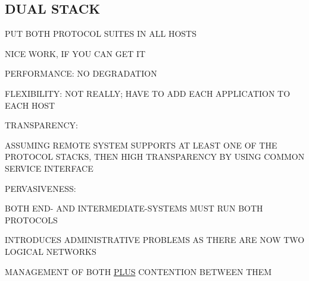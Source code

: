\begin{bwslide}
\part*	{DUAL STACK}\bf

\begin{nrtc}
\item	PUT BOTH PROTOCOL SUITES IN ALL HOSTS

\item	NICE WORK, IF YOU CAN GET IT
\end{nrtc}
\end{bwslide}




\begin{bwslide}

\begin{nrtc}
\item	PERFORMANCE: NO DEGRADATION

\item	FLEXIBILITY: NOT REALLY; HAVE TO ADD EACH APPLICATION TO EACH HOST

\item	TRANSPARENCY:
    \begin{nrtc}
    \item	ASSUMING REMOTE SYSTEM SUPPORTS AT LEAST ONE OF THE PROTOCOL
		STACKS, THEN HIGH TRANSPARENCY BY USING COMMON SERVICE
		INTERFACE
    \end{nrtc}

\item	PERVASIVENESS:
    \begin{nrtc}
    \item	BOTH END- AND INTERMEDIATE-SYSTEMS MUST RUN BOTH PROTOCOLS

    \item	INTRODUCES ADMINISTRATIVE PROBLEMS AS THERE ARE NOW TWO
		LOGICAL NETWORKS
	\begin{nrtc}
	\item	MANAGEMENT OF BOTH \underline{PLUS} CONTENTION BETWEEN THEM
	\end{nrtc}
    \end{nrtc}
\end{nrtc}
\end{bwslide}


